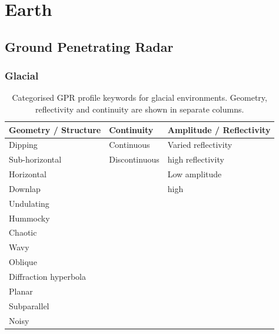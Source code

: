 \clearpage
\section{Earth}
\subsection{Ground Penetrating Radar}
\subsubsection{Glacial}
\begin{table}[h!]
\centering
\caption{Categorised GPR profile keywords for glacial environments. Geometry, reflectivity and continuity are shown in separate columns.}
\begin{tabular}{|p{5cm}|p{5cm}|p{5cm}|}
\hline
\textbf{Geometry / Structure} & \textbf{Continuity} & \textbf{Amplitude / Reflectivity} \\
\hline
Dipping & Continuous & Varied reflectivity \\
Sub-horizontal & Discontinuous & high reflectivity \\
Horizontal & & Low amplitude \\
Downlap & & high \\
Undulating & & \\
Hummocky & & \\
Chaotic & & \\
Wavy & & \\
Oblique & & \\
Diffraction hyperbola & & \\
Planar & & \\
Subparallel & & \\
Noisy & & \\
\hline
\end{tabular}
\label{tab:glacial-keywords}
\end{table}


